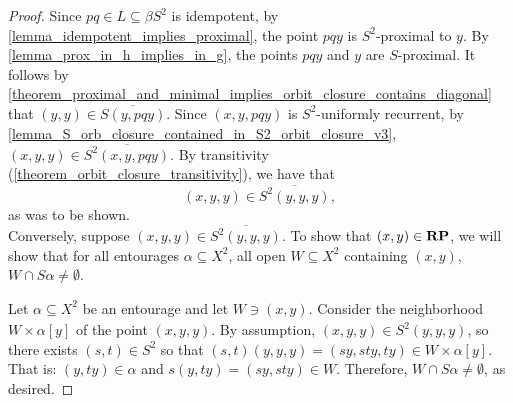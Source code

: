 \begin{proof}
    Since $pq \in L \subseteq \beta S^2$ is idempotent, by \cref{lemma_idempotent_implies_proximal}, the point $pq y$ is $S^2$-proximal to $y$. By \cref{lemma_prox_in_h_implies_in_g}, the points $pq y$ and $y$ are $S$-proximal. It follows by \cref{theorem_proximal_and_minimal_implies_orbit_closure_contains_diagonal} that $(y,y) \in \overline{S(y,pqy)}$. Since $(x,y, pq y)$ is $S^2$-uniformly recurrent, by \cref{lemma_S_orb_closure_contained_in_S2_orbit_closure_v3}, $(x, y, y) \in \overline{S^2 (x, y, pq y)}$. By transitivity (\cref{theorem_orbit_closure_transitivity}), we have that
    \[(x, y, y) \in \overline{S^2 (y,y,y)},\]
    as was to be shown.\\

    Conversely, suppose $(x,y,y) \in \overline{S^2 (y,y,y)}$. To show that $(x,y) \in \mathbf{RP}$, we will show that for all entourages $\alpha \subseteq X^2$, all open $W \subseteq X^2$ containing $(x,y)$, $W \cap S \alpha \neq \emptyset$.
    
    Let $\alpha \subseteq X^2$ be an entourage and let $W \ni (x,y)$. Consider the neighborhood $W \times \alpha[y]$ of the point $(x,y,y)$.   By assumption, $(x,y,y) \in \overline{S^2 (y,y,y)}$, so there exists $(s,t) \in S^2$ so that $(s,t)(y,y,y) = (sy,sty,ty) \in W \times \alpha[y]$. That is: $(y,ty) \in \alpha$ and $s(y,ty) = (sy,sty) \in W$.  Therefore, $W \cap S \alpha \neq \emptyset$, as desired.
\end{proof}


    
